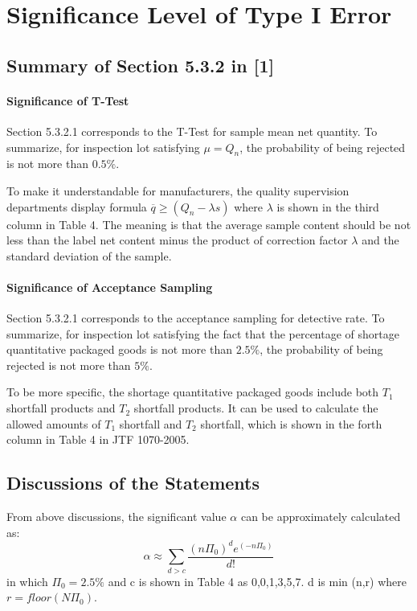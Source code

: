 \documentclass[a4paper]{article}
\begin{document}
\newpage

\section{Significance Level of Type I Error}
\subsection{Summary of Section 5.3.2 in [1]}
\paragraph{Significance of T-Test}
Section 5.3.2.1 corresponds to the T-Test for sample mean net quantity. To summarize, for inspection lot satisfying $\mu=Q_n$, the probability of being rejected is not more than $0.5\%$.

To make it understandable for manufacturers, the quality supervision departments display formula $\overline{q} \geq (Q_n-\lambda s)$ where $\lambda$ is shown in the third column in Table 4. The meaning is that the average sample content should be not less than the label net content minus the product of correction factor $\lambda$ and the standard deviation of the sample. 
\paragraph{Significance of Acceptance Sampling}
Section 5.3.2.1 corresponds to the acceptance sampling for detective rate. To summarize, for inspection lot satisfying the fact that the percentage of shortage quantitative packaged goods is not more than $2.5\%$, the probability of being rejected is not more than $5\%$.

To be more specific, the shortage quantitative packaged goods include both $ T_{1} $ shortfall products and $ T_{2} $ shortfall products. It can be used to calculate the allowed amounts of  $ T_{1} $ shortfall and $ T_{2} $ shortfall, which is shown in the forth column in Table 4 in JTF 1070-2005.

\subsection{Discussions of the Statements}
From above discussions, the significant value $ \alpha $ can be approximately calculated as:
\begin{equation}
    \alpha \approx \sum_{d>c} \frac{(n\Pi_0)^d e^{(-n\Pi_0)}}{d!}
\end{equation}
in which $\Pi_0=2.5\%$ and c is shown in Table 4 as 0,0,1,3,5,7. d is min (n,r) where $r=floor(N\Pi_0)$.
\end{document}

